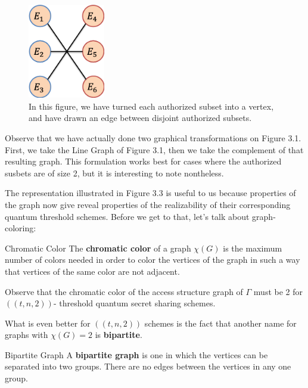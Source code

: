 \begin{figure}[h]
	\label{2-4-2-graph}
	\begin{center}
		\includegraphics[width=0.3\textwidth]{Images/ch3-fig3.png}
	\end{center}
	\caption{In this figure, we have turned each authorized subset into a vertex, and have drawn an edge between disjoint authorized subsets.}
\end{figure}

\begin{remark}
	Observe that we have actually done two graphical transformations on Figure 3.1. First, we take the Line Graph of Figure 3.1, then we take the complement of that resulting graph. This formulation works best for cases where the authorized susbets are of size 2, but it is interesting to note nontheless.
\end{remark}

The representation illustrated in Figure 3.3 is useful to us because properties of the graph now give reveal properties of the realizability of their corresponding quantum threshold schemes. Before we get to that, let's talk about graph-coloring:

\theoremstyle{definition}
\begin{definition}{Chromatic Color}
	The \textbf{chromatic color} of a graph $\chi(G)$ is the maximum number of colors needed in order to color the vertices of the graph in such a way that vertices of the same color are not adjacent.
\end{definition}

\begin{remark}
	Observe that the chromatic color of the access structure graph of $\Gamma$ must be 2 for $((t,n,2))$- threshold quantum secret sharing schemes.
\end{remark}

What is even better for $((t,n,2))$ schemes is the fact that another name for graphs with $\chi(G)=2$ is \textbf{bipartite}.

\theoremstyle{definition}
\begin{definition}{Bipartite Graph}
	A \textbf{bipartite graph} is one in which the vertices can be separated into two groups. There are no edges between the vertices in any one group.
\end{definition}

